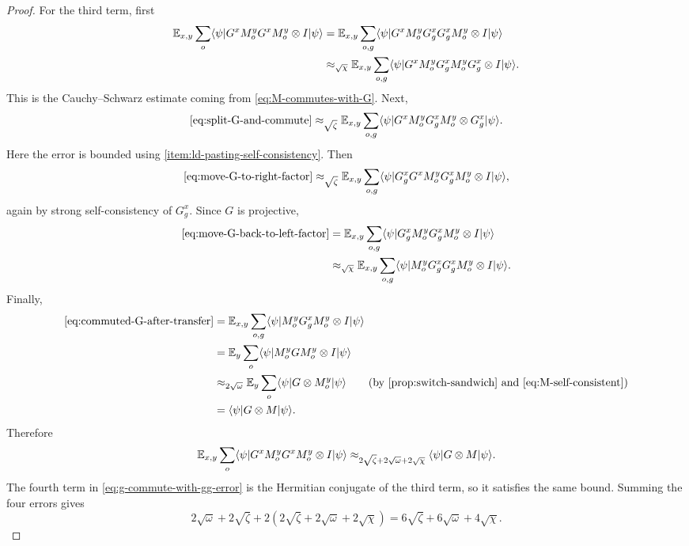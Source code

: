 \begin{proof}
	For the third term, first
	\begin{align}
		\mathbb{E}_{x,y} \sum_o \langle \psi \rvert G^x M_o^y G^x M_o^y \otimes I \lvert \psi \rangle
		 & =
		\mathbb{E}_{x,y} \sum_{o,g} \langle \psi \rvert G^x M_o^y G_g^x G_g^x M_o^y \otimes I \lvert \psi \rangle \nonumber \\
		 & \approx_{\sqrt{\chi}}
		\mathbb{E}_{x,y} \sum_{o,g} \langle \psi \rvert G^x M_o^y G_g^x M_o^y G_g^x \otimes I \lvert \psi \rangle.
		\label{eq:split-G-and-commute}
	\end{align}
	This is the Cauchy--Schwarz estimate coming from \ref{eq:M-commutes-with-G}. Next,
	\begin{equation}\label{eq:move-G-to-right-factor}
		\eqref{eq:split-G-and-commute}
		\approx_{\sqrt{\zeta}}
		\mathbb{E}_{x,y} \sum_{o,g} \langle \psi \rvert G^x M_o^y G_g^x M_o^y \otimes G_g^x \lvert \psi \rangle.
	\end{equation}
	Here the error is bounded using \ref{item:ld-pasting-self-consistency}. Then
	\begin{equation}\label{eq:move-G-back-to-left-factor}
		\eqref{eq:move-G-to-right-factor}
		\approx_{\sqrt{\zeta}}
		\mathbb{E}_{x,y} \sum_{o,g} \langle \psi \rvert G_g^x G^x M_o^y G_g^x M_o^y \otimes I \lvert \psi \rangle,
	\end{equation}
	again by strong self-consistency of $G_g^x$. Since $G$ is projective,
	\begin{align}
		\eqref{eq:move-G-back-to-left-factor}
		 & =
		\mathbb{E}_{x,y} \sum_{o,g} \langle \psi \rvert G_g^x M_o^y G_g^x M_o^y \otimes I \lvert \psi \rangle \nonumber \\
		 & \approx_{\sqrt{\chi}}
		\mathbb{E}_{x,y} \sum_{o,g} \langle \psi \rvert M_o^y G_g^x G_g^x M_o^y \otimes I \lvert \psi \rangle.
		\label{eq:commuted-G-after-transfer}
	\end{align}
	Finally,
	\begin{align*}
		\eqref{eq:commuted-G-after-transfer}
		 & =
		\E_{x,y} \sum_{o,g} \bra{\psi} M_o^y G_g^x M_o^y \ot I \ket{\psi}         \\
		 & =
		\E_y \sum_o \bra{\psi} M_o^y G M_o^y \ot I \ket{\psi}                     \\
		 & \approx_{2\sqrt{\omega}} \E_y \sum_o \bra{\psi} G \ot M_o^y \ket{\psi}
		\tag{by \ref{prop:switch-sandwich} and \ref{eq:M-self-consistent}}        \\
		 & =
		\bra{\psi} G \ot M \ket{\psi}.
	\end{align*}
	Therefore
	\begin{equation}\label{eq:third-error-term-bound}
		\mathbb{E}_{x,y} \sum_o \langle \psi \rvert G^x M_o^y G^x M_o^y \otimes I \lvert \psi \rangle
		\approx_{2\sqrt{\zeta}+2\sqrt{\omega}+2\sqrt{\chi}}
		\langle \psi \rvert G \otimes M \lvert \psi \rangle.
	\end{equation}
	The fourth term in \ref{eq:g-commute-with-gg-error} is the Hermitian conjugate of the third term, so it satisfies the same bound. Summing the four errors gives
	\[
		2\sqrt{\omega}+2\sqrt{\zeta}+2(2\sqrt{\zeta}+2\sqrt{\omega}+2\sqrt{\chi})
		=
		6\sqrt{\zeta}+6\sqrt{\omega}+4\sqrt{\chi}.
	\]
\end{proof}
